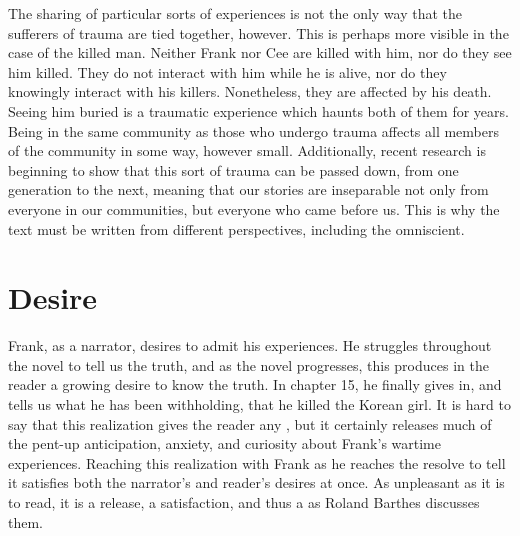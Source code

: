 \documentclass[12pt]{article}
\begin{document}
The sharing of particular sorts of experiences is not the only way that the
sufferers of trauma are tied together, however. This is perhaps more visible in
the case of the killed man. Neither Frank nor Cee are killed with him, nor do
they see him killed. They do not interact with him while he is alive, nor do
they knowingly interact with his killers. Nonetheless, they are affected by his
death. Seeing him buried is a traumatic experience which haunts both of them
for years. Being in the same community as those who undergo trauma affects all
members of the community in some way, however small. Additionally, recent
research is beginning to show that this sort of trauma can be passed down, from
one generation to the next,\autocite{dias,weathering} meaning that our stories
are inseparable not only from everyone in our communities, but everyone who
came before us. This is why the text must be written from different
perspectives, including the omniscient.

\section{Desire}

Frank, as a narrator, desires to admit his experiences. He struggles throughout
the novel to tell us the truth, and as the novel progresses, this produces in
the reader a growing desire to know the truth. In chapter
15,\autocite[p.~133]{home} he finally gives in, and tells us what he has been
withholding, that he killed the Korean girl. It is hard to say that this
realization gives the reader any , but it certainly releases much
of the pent-up anticipation, anxiety, and curiosity about Frank's wartime
experiences.  Reaching this realization with Frank as he reaches the resolve to
tell it satisfies both the narrator's and reader's desires at once. As
unpleasant as it is to read, it is a release, a satisfaction, and thus a
 as Roland Barthes discusses them.\autocite[p.
124]{narrative-medicine}
\end{document}

